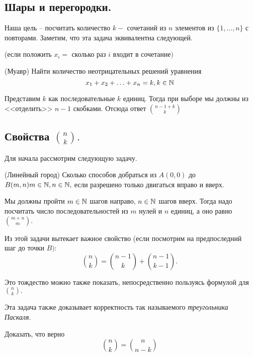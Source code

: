 \subsection{Шары и перегородки.}

Наша цель -- посчитать количество $k-$ сочетаний из $n$ элементов из $\{1, \dots, n\}$ с повторами. Заметим, что эта задача эквивалентна следующей. 

(если положить $x_i = \text{ сколько раз $i$ входит в сочетание})$

\begin{problem}
    (Муавр) Найти количество неотрицательных решений уравнения $$x_1 + x_2 + \ldots + x_n = k, k \in \mathbb{N}$$
\end{problem}

\begin{solution}
    Представим $k$ как последовательные $k$ единиц. Тогда при выборе мы должны из <<отделить>> $n - 1$ скобками. Отсюда ответ $\binom{n - 1 + k}{k}$
\end{solution}

\subsection{Свойства $\binom{n}{k}.$}

Для начала рассмотрим следующую задачу.

\begin{problem}
    (Линейный город) Сколько способов добраться из $A(0, 0)$ до $B(m,n) m \in \mathbb{N}, n \in \mathbb{N} ,$ если разрешено только двигаться вправо и вверх.
\end{problem}

\begin{solution}
    Мы должны пройти $m \in \mathbb{N}$ шагов направо, $n \in \mathbb{N}$ шагов вверх. Тогда надо посчитать число последовательностей из $m$ нулей и $n$ единиц, а оно равно $\binom{m + n}{m}.$
\end{solution}

Из этой задачи вытекает важное свойство (если посмотрим на предпоследний шаг до точки $B)$:
$$\binom{n}{k} = \binom{n - 1}{k} + \binom{n - 1}{k - 1}.$$ 

Это тождество можно также показать, непосредственно пользуясь формулой для $\binom{n}{k}.$

Эта задача также доказывает корректность так называемого 
\textit{треугольника Паскаля.}

\begin{problem}
Доказать, что верно
    $$\binom{n}{k} = \binom{n}{n - k}$$
\end{problem}

